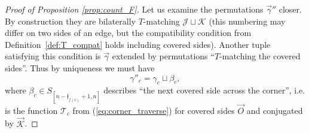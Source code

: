 \documentclass{amsart}
\begin{document}
\begin{proof}[Proof of Proposition \ref{prop:count_F}]
Let us examine the permutations $\vec\gamma''$ closer. By construction they are bilaterally $T$-matching $\mathcal{J}\sqcup\mathcal{K}$ (this numbering may differ on two sides of an edge, but the compatibility condition from Definition~\ref{def:T_compat} holds including covered sides). Another tuple satisfying this condition is $\vec\gamma$ extended by permutations ``$T$-matching the covered sides''. Thus by uniqueness we must have
\begin{equation}\label{eq:gamma_juxtaposition}
\gamma''_c=\gamma_c\sqcup\beta_c,
\end{equation}
where $\beta_c\in S_{[n-\mathfrak{f}_{f(c)}+1,n]}$ describes ``the next covered side across the corner'', i.e. is the function $\mathcal{T}_c$ from (\ref{eq:corner_traverse}) for covered sides $\vec{O}$ and conjugated by $\vec{\mathcal{K}}$.


\end{proof}
\end{document}
